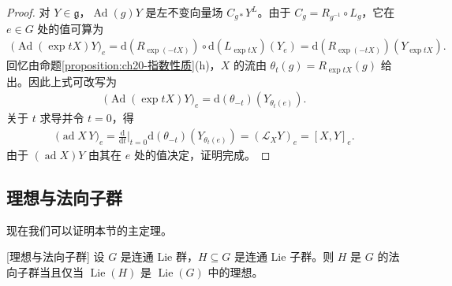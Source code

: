\documentclass[../../main.tex]{subfiles}
\begin{document}
\begin{proof}
对 $Y\in\mathfrak g$，$\operatorname{Ad}(g)Y$ 是左不变向量场 $C_{g*}Y^L$。由于 $C_g=R_{g^{-1}}\circ L_g$，它在 $e\in G$ 处的值可算为
\begin{align*}
\bigl(\operatorname{Ad}(\exp tX)Y\bigr)_e=\mathrm{d}(R_{\exp(-tX)})\circ\mathrm{d}(L_{\exp tX})(Y_e)=\mathrm{d}(R_{\exp(-tX)})(Y_{\exp tX}).
\end{align*}
回忆由命题\cref{proposition:ch20-指数性质}(h)，$X$ 的流由 $\theta_t(g)=R_{\exp tX}(g)$ 给出。因此上式可改写为
\begin{align*}
\bigl(\operatorname{Ad}(\exp tX)Y\bigr)_e=\mathrm{d}(\theta_{-t})(Y_{\theta_t(e)}).
\end{align*}
关于 $t$ 求导并令 $t=0$，得
\begin{align*}
\bigl(\operatorname{ad}X\,Y\bigr)_e=\frac{\mathrm{d}}{\mathrm{d}t}\bigg|_{t=0}\mathrm{d}(\theta_{-t})(Y_{\theta_t(e)})=(\mathcal L_XY)_e=[X,Y]_e.
\end{align*}
由于 $(\operatorname{ad}X)Y$ 由其在 $e$ 处的值决定，证明完成。
\end{proof}

\subsection{理想与法向子群}

现在我们可以证明本节的主定理。

\begin{theorem}{[理想与法向子群]}\label{theorem:ch20-理想与法向子群}
设 $G$ 是连通 Lie 群，$H\subseteq G$ 是连通 Lie 子群。则 $H$ 是 $G$ 的法向子群当且仅当 $\operatorname{Lie}(H)$ 是 $\operatorname{Lie}(G)$ 中的理想。
\end{theorem}
\end{document}
